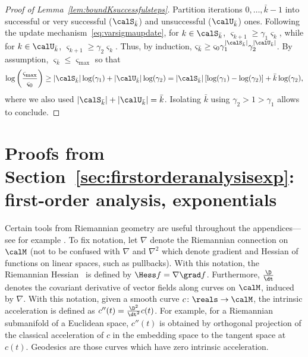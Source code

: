 \begin{proof}[Proof of Lemma~\ref{lem:boundKsuccessfulsteps}]
	Partition iterations $0, \ldots, \bar k - 1$ into successful or very successful ($\calS_{\bar k}$) and unsuccessful ($\calU_{\bar k}$) ones.
	Following the update mechanism~\eqref{eq:varsigmaupdate}, for $k \in \calS_{\bar k}$, $\varsigma_{k+1} \geq \gamma_1 \varsigma_k$, while for $k \in \calU_{\bar k}$, $\varsigma_{k+1} \geq \gamma_2 \varsigma_k$. Thus, by induction, $\varsigma_{\bar k} \geq \varsigma_0 \gamma_1^{|\calS_{\bar k}|} \gamma_2^{|\calU_{\bar k}|}$. By assumption, $\varsigma_{\bar k} \leq \varsigma_{\max}$ so that
	\begin{align*}
		\log\left(\frac{\varsigma_{\max}}{\varsigma_0}\right) \geq |\calS_{\bar k}| \log(\gamma_1) + |\calU_{\bar k}| \log(\gamma_2) = |\calS_{\bar k}|\left[\log(\gamma_1) - \log(\gamma_2)\right] + \bar k \log(\gamma_2),
	\end{align*}
	where we also used $|\calS_{\bar k}| + |\calU_{\bar k}| = \bar k$. Isolating $\bar k$ using $\gamma_2 > 1 > \gamma_1$ %
	allows to conclude.
\end{proof}



\section{Proofs from Section~\ref{sec:firstorderanalysisexp}: first-order analysis, exponentials} \label{app:firstorderexp}

Certain tools from Riemannian geometry are useful throughout the appendices---see for example \cite[pp59--67]{oneill}. To fix notation, let $\nabla$ denote the Riemannian connection on $\calM$ (not to be confused with $\nabla$ and $\nabla^2$ which denote gradient and Hessian of functions on linear spaces, such as pullbacks). With this notation, the Riemannian Hessian~\cite[Def.~5.5.1]{AMS08} is defined by $\Hess f = \nabla \grad f$. Furthermore, $\frac{\D}{\dt}$ denotes the covariant derivative of vector fields along curves on $\calM$, induced by $\nabla$. With this notation, given a smooth curve $c \colon \reals \to \calM$, the intrinsic acceleration is defined as $c''(t) = \frac{\D^2}{\dt^2} c(t)$. For example, for a Riemannian submanifold of a Euclidean space, $c''(t)$ is obtained by orthogonal projection of the classical acceleration of $c$ in the embedding space to the tangent space at $c(t)$. Geodesics are those curves which have zero intrinsic acceleration.

